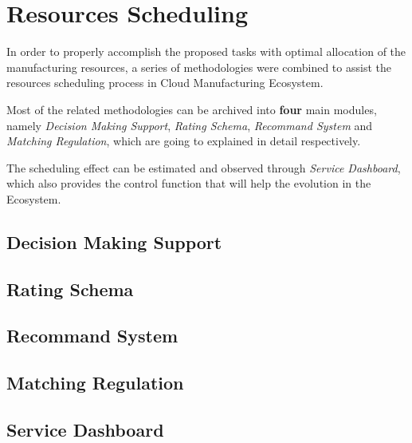 \section{Resources Scheduling} %
\label{sec:model}

In order to properly accomplish the proposed tasks with optimal allocation of the manufacturing resources, a series of methodologies were combined to assist the resources scheduling process in Cloud Manufacturing Ecosystem.

Most of the related methodologies can be archived into \textbf{four} main modules, namely \textit{Decision Making Support}, \textit{Rating Schema}, \textit{Recommand System} and \textit{Matching Regulation}, which are going to explained in detail respectively.

The scheduling effect can be estimated and observed through \textit{Service Dashboard}, which also provides the control function that will help the evolution in the Ecosystem.

\subsection{Decision Making Support} %
\label{sub:decision_making_support}


\subsection{Rating Schema} %
\label{sub:rating_schema}


\subsection{Recommand System} %
\label{sub:recommand_system}


\subsection{Matching Regulation} %
\label{sub:matching_regulation}


\subsection{Service Dashboard} %
\label{sub:service_dashboard}



